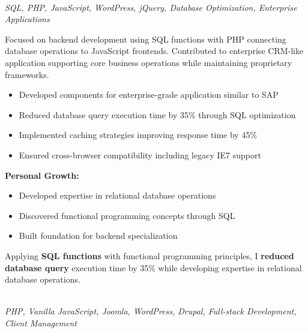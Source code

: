 \documentclass[a4paper,10pt]{article}
\newcommand{\experiencebreak}{\needspace{18\baselineskip}}
\begin{document}
\experiencebreak
\noindent\uline{} \\
\vspace{0.1cm} \hspace{0.2cm}
{\small\textit{SQL, PHP, JavaScript, WordPress, jQuery, Database Optimization, Enterprise Applications}}

Focused on backend development using SQL functions with PHP connecting database operations to JavaScript frontends. Contributed to enterprise CRM-like application supporting core business operations while maintaining proprietary frameworks.

\vspace{0.2cm}
\begin{itemize}[label=\textcolor{darkblue}{\textbullet}, leftmargin=*, nosep]
	\item Developed components for enterprise-grade application similar to SAP
	\item Reduced database query execution time by 35\% through SQL optimization
	\item Implemented caching strategies improving response time by 45\%
	\item Ensured cross-browser compatibility including legacy IE7 support
\end{itemize}

\vspace{0.2cm}
\textbf{Personal Growth:}
\vspace{0.2cm}
\begin{itemize}[label=\textcolor{darkblue}{\textbullet}, leftmargin=*, nosep]
	\item Developed expertise in relational database operations
	\item Discovered functional programming concepts through SQL
	\item Built foundation for backend specialization
\end{itemize}

\vspace{0.2cm}

Applying \textbf{SQL functions} with functional programming principles,
I \textbf{reduced database query} execution time by 35\% while developing expertise in
relational database operations.



\vspace{0.4cm}


\experiencebreak
\noindent\uline{} \\
\vspace{0.1cm} \hspace{0.2cm}
{\small\textit{PHP, Vanilla JavaScript, Joomla, WordPress, Drupal, Full-stack Development, Client Management}}
\end{document}
